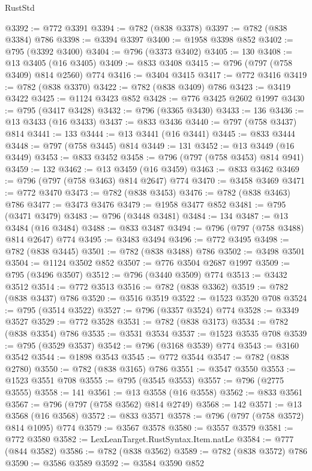 \begin{lexlean}{RustStd}
\begin{coremodule}
@3392 := @772 @3391
@3394 := @782 (@838 @3378)
@3397 := @782 (@838 @3384) @786
@3398 := @3394 @3397
@3400 := @1958 @3398 @852
@3402 := @795 (@3392 @3400)
@3404 := @796 (@3373 @3402)
@3405 := 130
@3408 := @13 @3405 (@16 @3405)
@3409 := @833 @3408
@3415 := @796 (@797 (@758 @3409) @814 @2560) @774
@3416 := @3404 @3415
@3417 := @772 @3416
@3419 := @782 (@838 @3370)
@3422 := @782 (@838 @3409) @786
@3423 := @3419 @3422
@3425 := @1124 @3423 @852
@3428 := @776 @3425 @2602 @1997
@3430 := @795 (@3417 @3428)
@3432 := @796 (@3365 @3430)
@3433 := 136
@3436 := @13 @3433 (@16 @3433)
@3437 := @833 @3436
@3440 := @797 (@758 @3437) @814
@3441 := 133
@3444 := @13 @3441 (@16 @3441)
@3445 := @833 @3444
@3448 := @797 (@758 @3445) @814
@3449 := 131
@3452 := @13 @3449 (@16 @3449)
@3453 := @833 @3452
@3458 := @796 (@797 (@758 @3453) @814 @941)
@3459 := 132
@3462 := @13 @3459 (@16 @3459)
@3463 := @833 @3462
@3469 := @796 (@797 (@758 @3463) @814 @2647) @774
@3470 := @3458 @3469
@3471 := @772 @3470
@3473 := @782 (@838 @3453)
@3476 := @782 (@838 @3463) @786
@3477 := @3473 @3476
@3479 := @1958 @3477 @852
@3481 := @795 (@3471 @3479)
@3483 := @796 (@3448 @3481)
@3484 := 134
@3487 := @13 @3484 (@16 @3484)
@3488 := @833 @3487
@3494 := @796 (@797 (@758 @3488) @814 @2647) @774
@3495 := @3483 @3494
@3496 := @772 @3495
@3498 := @782 (@838 @3445)
@3501 := @782 (@838 @3488) @786
@3502 := @3498 @3501
@3504 := @1124 @3502 @852
@3507 := @776 @3504 @2687 @1997
@3509 := @795 (@3496 @3507)
@3512 := @796 (@3440 @3509) @774
@3513 := @3432 @3512
@3514 := @772 @3513
@3516 := @782 (@838 @3362)
@3519 := @782 (@838 @3437) @786
@3520 := @3516 @3519
@3522 := @1523 @3520 @708
@3524 := @795 (@3514 @3522)
@3527 := @796 (@3357 @3524) @774
@3528 := @3349 @3527
@3529 := @772 @3528
@3531 := @782 (@838 @3173)
@3534 := @782 (@838 @3354) @786
@3535 := @3531 @3534
@3537 := @1523 @3535 @708
@3539 := @795 (@3529 @3537)
@3542 := @796 (@3168 @3539) @774
@3543 := @3160 @3542
@3544 := @1898 @3543
@3545 := @772 @3544
@3547 := @782 (@838 @2780)
@3550 := @782 (@838 @3165) @786
@3551 := @3547 @3550
@3553 := @1523 @3551 @708
@3555 := @795 (@3545 @3553)
@3557 := @796 (@2775 @3555)
@3558 := 141
@3561 := @13 @3558 (@16 @3558)
@3562 := @833 @3561
@3567 := @796 (@797 (@758 @3562) @814 @2749)
@3568 := 142
@3571 := @13 @3568 (@16 @3568)
@3572 := @833 @3571
@3578 := @796 (@797 (@758 @3572) @814 @1095) @774
@3579 := @3567 @3578
@3580 := @3557 @3579
@3581 := @772 @3580
@3582 := LexLeanTarget.RustSyntax.Item.natLe
@3584 := @777 (@844 @3582)
@3586 := @782 (@838 @3562)
@3589 := @782 (@838 @3572) @786
@3590 := @3586 @3589
@3592 := @3584 @3590 @852

\end{coremodule}
\end{lexlean}

